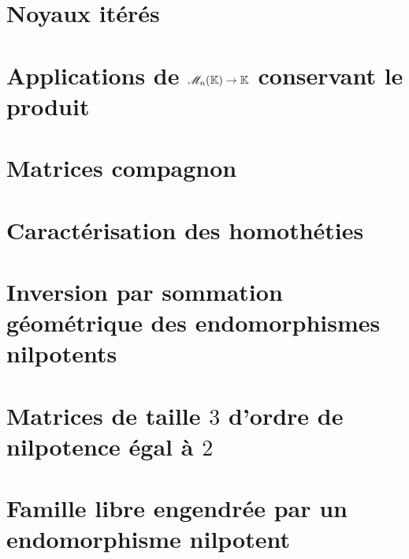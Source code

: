 \section{Noyaux itérés}


\section{Applications de \texorpdfstring{$\mathscr{M}_n(\mathbb{K}) \to \mathbb{K}$}{l'espace des matrices carrées dans le corps K} conservant le produit}


\section{Matrices compagnon}


\section{Caractérisation des homothéties}


\section{Inversion par sommation géométrique des endomorphismes nilpotents} 


\section{Matrices de taille \texorpdfstring{$3$}{3} d'ordre de nilpotence égal à \texorpdfstring{$2$}{2}} 


\section{Famille libre engendrée par un endomorphisme nilpotent} 


